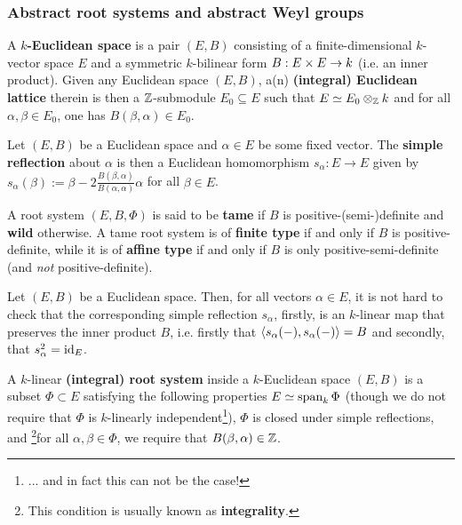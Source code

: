         \subsubsection{Abstract root systems and abstract Weyl groups}
            \begin{definition} \label{defL euclidean_spaces}
                A \textbf{$k$-Euclidean space} is a pair $(E, B)$ consisting of a finite-dimensional $k$-vector space $E$ and a symmetric $k$-bilinear form $B: E \x E \to k$ (i.e. an inner product). Given any Euclidean space $(E, B)$, a(n) \textbf{(integral) Euclidean lattice} therein is then a $\mathbb{Z}$-submodule $E_0 \subseteq E$ such that $E \cong E_0 \tensor_{\Z} k$ and for all $\alpha, \beta \in E_0$, one has $B(\beta, \alpha) \in E_0$.
            \end{definition}
            \begin{definition} \label{def: simple_reflections}
                Let $(E, B)$ be a Euclidean space and $\alpha \in E$ be some fixed vector. The \textbf{simple reflection} about $\alpha$ is then a Euclidean homomorphism $s_{\alpha}: E \to E$ given by $s_{\alpha}(\beta) := \beta - 2\frac{B(\beta, \alpha)}{B(\alpha, \alpha)} \alpha$ for all $\beta \in E$.
                
                A root system $(E, B, \Phi)$ is said to be \textbf{tame} if $B$ is positive-(semi-)definite and \textbf{wild} otherwise. A tame root system is of \textbf{finite type} if and only if $B$ is positive-definite, while it is of \textbf{affine type} if and only if $B$ is only positive-semi-definite (and \textit{not} positive-definite).
            \end{definition}
            \begin{remark} \label{remark: simple_reflections_are_involutive_isometries}
                Let $(E, B)$ be a Euclidean space. Then, for all vectors $\alpha \in E$, it is not hard to check that the corresponding simple reflection $s_{\alpha}$, firstly, is an $k$-linear map that preserves the inner product $B$, i.e. firstly that $\langle s_{\alpha}(-), s_{\alpha}(-)\rangle =B$ and secondly, that $s_{\alpha}^2 = \mathrm{id}_E$.
            \end{remark}
            \begin{definition} \label{def: abstract_root_systems}
                A $k$-linear \textbf{(integral) root system} inside a $k$-Euclidean space $(E, B)$ is a subset $\Phi \subset E$ satisfying the following properties $E \simeq \operatorname{span}_k \Phi$ (though we do not require that $\Phi$ is $k$-linearly independent\footnote{... and in fact this can not be the case!}), $\Phi$ is closed under simple reflections, and \footnote{This condition is usually known as \textbf{integrality}.}for all $\alpha, \beta \in \Phi$, we require that $B(\beta, \alpha) \in \mathbb{Z}$.
            \end{definition}
